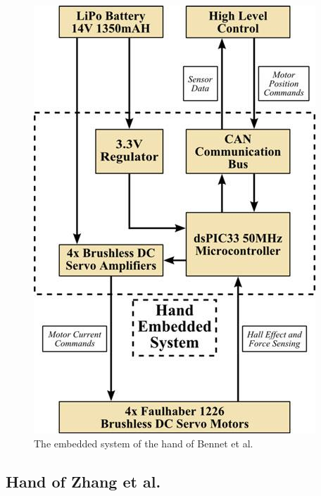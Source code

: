 \documentclass[a4paper, 10pt, conference]{ieeeconf}      %
\begin{document}
\begin{figure}[h]

	\centering
	\includegraphics[scale=0.7]{images/Bennett2}
	
	\caption{The embedded system of the hand of Bennet et al.}
	\label{fig:embbennett}
\end{figure}

\subsection{Hand of Zhang et al.}
\end{document}
